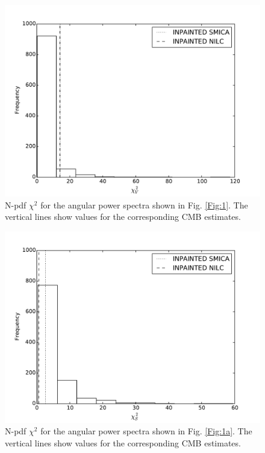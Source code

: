 \begin{figure}
\centering
\includegraphics[width=\textwidth]{figures/chapter-vsk/vchi2.pdf}
\caption{N-pdf $\chi^ 2$ for the angular power spectra shown in Fig. \ref{Fig:1}. The vertical lines show values for the corresponding CMB estimates.}
\label{Fig:2}
\end{figure}

\begin{figure}
\centering
\includegraphics[width=\textwidth]{figures/chapter-vsk/schi2.pdf}
\caption{N-pdf $\chi^ 2$ for the angular power spectra shown in Fig. \ref{Fig:1a}. The vertical lines show values for the corresponding CMB estimates.}
\label{Fig:2a}
\end{figure}

